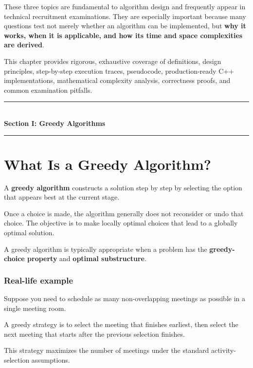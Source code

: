 These three topics are fundamental to algorithm design and frequently appear in technical recruitment examinations. They are especially important because many questions test not merely whether an algorithm can be implemented, but \textbf{why it works, when it is applicable, and how its time and space complexities are derived}.

This chapter provides rigorous, exhaustive coverage of definitions, design principles, step-by-step execution traces, pseudocode, production-ready C++ implementations, mathematical complexity analysis, correctness proofs, and common examination pitfalls.


\begin{center}
\vspace{0.5em}
{\color{primary}\rule{0.45\textwidth}{1.2pt}}\\[4pt]
{\Large\bfseries\color{primary} Section I: Greedy Algorithms}\\[2pt]
{\color{primary}\rule{0.45\textwidth}{1.2pt}}
\vspace{0.5em}
\end{center}


\section{What Is a Greedy Algorithm?}

A \textbf{greedy algorithm} constructs a solution step by step by selecting the option that appears best at the current stage.

Once a choice is made, the algorithm generally does not reconsider or undo that choice. The objective is to make locally optimal choices that lead to a globally optimal solution.

A greedy algorithm is typically appropriate when a problem has the \textbf{greedy-choice property} and \textbf{optimal substructure}.

\subsubsection{Real-life example}

Suppose you need to schedule as many non-overlapping meetings as possible in a single meeting room.

A greedy strategy is to select the meeting that finishes earliest, then select the next meeting that starts after the previous selection finishes.

This strategy maximizes the number of meetings under the standard activity-selection assumptions.

